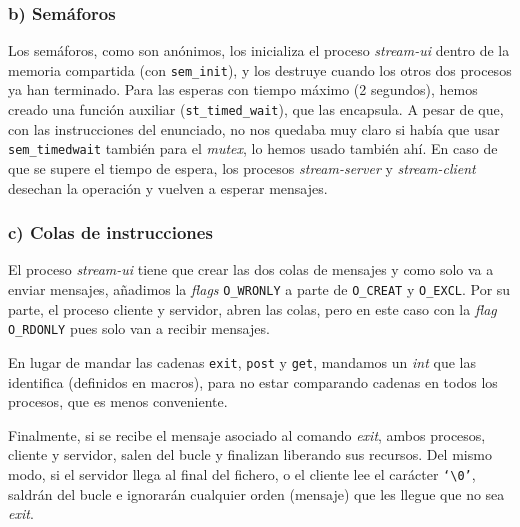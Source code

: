 \documentclass{article}
\begin{document}
\subsubsection*{b) Semáforos}
Los semáforos, como son anónimos, los inicializa el proceso \emph{stream-ui}
dentro de la memoria compartida (con \texttt{sem\_init}), y los destruye cuando los otros dos procesos ya han terminado. Para las esperas con tiempo máximo (2 segundos), hemos creado una función auxiliar (\texttt{st\_timed\_wait}), que las encapsula. A pesar de que, con las instrucciones del enunciado, no nos quedaba muy claro si había que usar \texttt{sem\_timedwait} también para el \emph{mutex}, lo hemos usado también ahí. En caso de que se supere el tiempo de espera, los procesos \textit{stream-server} y \textit{stream-client} desechan la operación y vuelven a esperar mensajes.


\subsubsection*{c) Colas de instrucciones}

El proceso \textit{stream-ui} tiene que crear las dos colas de mensajes y como solo va a enviar mensajes, añadimos la \textit{flags} \texttt{O\_WRONLY} a parte de  \texttt{O\_CREAT} y  \texttt{O\_EXCL}. Por su parte, el proceso cliente y servidor, abren las colas, pero en este caso con la \textit{flag} \texttt{O\_RDONLY} pues solo van a recibir mensajes.   

En lugar de mandar las cadenas \texttt{exit}, \texttt{post} y \texttt{get}, 
mandamos un \emph{int} que las identifica (definidos en macros), para no estar comparando cadenas en todos los procesos, que es menos conveniente.

Finalmente, si se recibe el mensaje asociado al comando \textit{exit}, ambos procesos, cliente y servidor, salen del bucle y finalizan liberando sus recursos. Del mismo modo, si el servidor llega al final del fichero, o el cliente lee el carácter \texttt{`\textbackslash0'}, saldrán del bucle e ignorarán cualquier orden (mensaje) que les llegue que no sea \textit{exit}.
\end{document}
